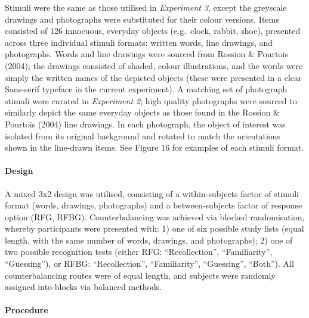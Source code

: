 \documentclass[
  11pt,
]{article}
\begin{document}
\hfill\break Stimuli were the same as those utilised in \emph{Experiment
3}, except the greyscale drawings and photographs were substituted for
their colour versions. Items consisted of 126 innocuous, everyday
objects (e.g.~clock, rabbit, shoe), presented across three individual
stimuli formats: written words, line drawings, and photographs. Words
and line drawings were sourced from Rossion \& Pourtois (2004); the
drawings consisted of shaded, colour illustrations, and the words were
simply the written names of the depicted objects (these were presented
in a clear Sans-serif typeface in the current experiment). A matching
set of photograph stimuli were curated in \emph{Experiment 2}; high
quality photographs were sourced to similarly depict the same everyday
objects as those found in the Rossion \& Pourtois (2004) line drawings.
In each photograph, the object of interest was isolated from its
original background and rotated to match the orientations shown in the
line-drawn items. See Figure 16 for examples of each stimuli format.

\hypertarget{design-3}{%
\paragraph{Design}\label{design-3}}

\hfill\break A mixed 3x2 design was utilised, consisting of a
within-subjects factor of stimuli format (words, drawings, photographs)
and a between-subjects factor of response option (RFG, RFBG).
Counterbalancing was achieved via blocked randomisation, whereby
participants were presented with: 1) one of six possible study lists
(equal length, with the same number of words, drawings, and
photographs); 2) one of two possible recognition tests (either RFG:
``Recollection'', ``Familiarity'', ``Guessing''), or RFBG:
``Recollection'', ``Familiarity'', ``Guessing'', ``Both''). All
counterbalancing routes were of equal length, and subjects were randomly
assigned into blocks via balanced methods.

\hypertarget{procedure-3}{%
\paragraph{Procedure}\label{procedure-3}}
\end{document}
